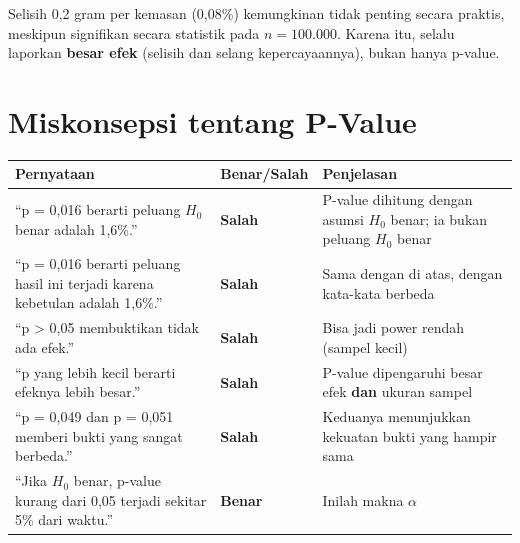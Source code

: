 \documentclass[
  indonesian,
  letterpaper,
]{book}
\newcounter{none} %
\begin{document}
Selisih 0,2 gram per kemasan (0,08\%) kemungkinan tidak penting secara
praktis, meskipun signifikan secara statistik pada \(n = 100.000\).
Karena itu, selalu laporkan \textbf{besar efek} (selisih dan selang
kepercayaannya), bukan hanya p-value.

\section{Miskonsepsi tentang P-Value}\label{miskonsepsi-tentang-p-value}

{\def\LTcaptype{none} %
\begin{longtable}[]{@{}
  >{\raggedright\arraybackslash}p{}
  >{\centering\arraybackslash}p{}
  >{\raggedright\arraybackslash}p{}@{}}
\toprule\noalign{}
\begin{minipage}[b]{\linewidth}\raggedright
Pernyataan
\end{minipage} & \begin{minipage}[b]{\linewidth}\centering
Benar/Salah
\end{minipage} & \begin{minipage}[b]{\linewidth}\raggedright
Penjelasan
\end{minipage} \\
\midrule\noalign{}
\endhead
\bottomrule\noalign{}
\endlastfoot
``p = 0,016 berarti peluang \(H_0\) benar adalah 1,6\%.'' &
\textbf{Salah} & P-value dihitung dengan asumsi \(H_0\) benar; ia bukan
peluang \(H_0\) benar \\
``p = 0,016 berarti peluang hasil ini terjadi karena kebetulan adalah
1,6\%.'' & \textbf{Salah} & Sama dengan di atas, dengan kata-kata
berbeda \\
``p \textgreater{} 0,05 membuktikan tidak ada efek.'' & \textbf{Salah} &
Bisa jadi power rendah (sampel kecil) \\
``p yang lebih kecil berarti efeknya lebih besar.'' & \textbf{Salah} &
P-value dipengaruhi besar efek \textbf{dan} ukuran sampel \\
``p = 0,049 dan p = 0,051 memberi bukti yang sangat berbeda.'' &
\textbf{Salah} & Keduanya menunjukkan kekuatan bukti yang hampir sama \\
``Jika \(H_0\) benar, p-value kurang dari 0,05 terjadi sekitar 5\% dari
waktu.'' & \textbf{Benar} & Inilah makna \(\alpha\) \\
\end{longtable}
}
\end{document}
